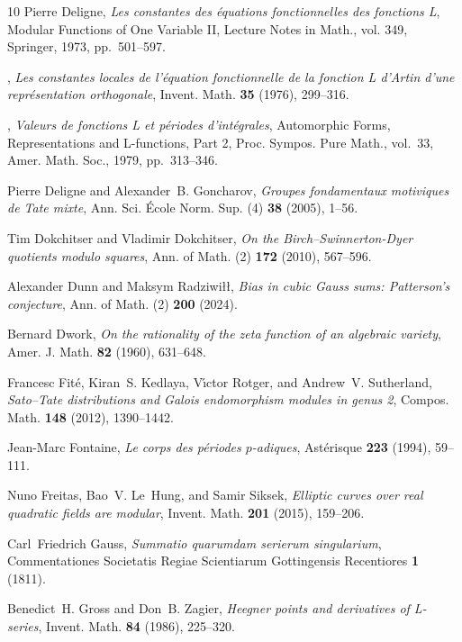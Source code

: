 \documentclass[11pt]{amsart}
\numberwithin{equation}{section}
\begin{document}
\begin{thebibliography}{10}
Pierre Deligne, \emph{Les constantes des {\'e}quations fonctionnelles des
  fonctions {L}}, Modular Functions of One Variable {II}, Lecture Notes in
  Math., vol. 349, Springer, 1973, pp.~501--597.

\bysame, \emph{Les constantes locales de l'{\'e}quation fonctionnelle de la
  fonction {L} d'{A}rtin d'une repr{\'e}sentation orthogonale}, Invent. Math.
  \textbf{35} (1976), 299--316.

\bysame, \emph{Valeurs de fonctions {L} et p{\'e}riodes d'int{\'e}grales},
  Automorphic Forms, Representations and {L}-functions, Part 2, Proc. Sympos.
  Pure Math., vol.~33, Amer. Math. Soc., 1979, pp.~313--346.

Pierre Deligne and Alexander~B. Goncharov, \emph{Groupes fondamentaux
  motiviques de {T}ate mixte}, Ann. Sci. {\'E}cole Norm. Sup. (4) \textbf{38}
  (2005), 1--56.

Tim Dokchitser and Vladimir Dokchitser, \emph{On the
  {B}irch--{S}winnerton-{D}yer quotients modulo squares}, Ann. of Math. (2)
  \textbf{172} (2010), 567--596.

Alexander Dunn and Maksym Radziwi{\l}{\l}, \emph{Bias in cubic {G}auss sums:
  {P}atterson's conjecture}, Ann. of Math. (2) \textbf{200} (2024).

Bernard Dwork, \emph{On the rationality of the zeta function of an algebraic
  variety}, Amer. J. Math. \textbf{82} (1960), 631--648.

Francesc Fit{\'e}, Kiran~S. Kedlaya, V{\'\i}ctor Rotger, and Andrew~V.
  Sutherland, \emph{Sato--{T}ate distributions and {G}alois endomorphism
  modules in genus 2}, Compos. Math. \textbf{148} (2012), 1390--1442.

Jean-Marc Fontaine, \emph{Le corps des p{\'e}riodes $p$-adiques},
  Ast{\'e}risque \textbf{223} (1994), 59--111.

Nuno Freitas, Bao~V. Le~Hung, and Samir Siksek, \emph{Elliptic curves over real
  quadratic fields are modular}, Invent. Math. \textbf{201} (2015), 159--206.

Carl~Friedrich Gauss, \emph{Summatio quarumdam serierum singularium},
  Commentationes Societatis Regiae Scientiarum Gottingensis Recentiores
  \textbf{1} (1811).

Benedict~H. Gross and Don~B. Zagier, \emph{Heegner points and derivatives of
  {L}-series}, Invent. Math. \textbf{84} (1986), 225--320.


\end{thebibliography}
\end{document}
